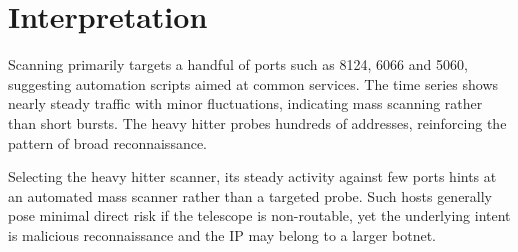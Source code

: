 \documentclass{article}
\begin{document}
\section{Interpretation}
Scanning primarily targets a handful of ports such as 8124, 6066 and 5060, suggesting automation scripts aimed at common services. The time series shows nearly steady traffic with minor fluctuations, indicating mass scanning rather than short bursts. The heavy hitter probes hundreds of addresses, reinforcing the pattern of broad reconnaissance.

Selecting the heavy hitter scanner, its steady activity against few ports hints at an automated mass scanner rather than a targeted probe. Such hosts generally pose minimal direct risk if the telescope is non-routable, yet the underlying intent is malicious reconnaissance and the IP may belong to a larger botnet.
\end{document}
